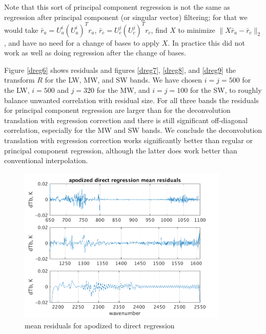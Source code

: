 \documentclass[11pt]{article}
\begin{document}
Note that this sort of principal component regression is not the
same as regression after principal component (or singular vector)
filtering; for that we would take $\bar r_a = U_a^i (U_a^i)^T r_a$,
$\bar r_c = U_c^j (U_c^j)^T r_c$, find $X$ to minimize $\|X \bar r_a
- \bar r_c\|_2$, and have no need for a change of bases to apply
$X$.  In practice this did not work as well as doing regression
after the change of bases.

Figure \ref{dreg6} shows residuals and figures \ref{dreg7},
\ref{dreg8}, and \ref{dreg9} the transform $R$ for the {\cris} LW,
MW, and SW bands.  We have chosen $i = j = 500$ for the LW, $i =
500$ and $j = 320$ for the MW, and $i = j = 100$ for the SW, to
roughly balance unwanted correlation with residual size.  For all
three bands the residuals for principal component regression are
larger than for the deconvolution translation with regression
correction and there is still significant off-diagonal correlation,
especially for the MW and SW bands.  We conclude the deconvolution
translation with regression correction works significantly better
than regular or principal component regression, although the latter
does work better than conventional interpolation.

\begin{figure} %
  \centering
  \includegraphics[height=7.5cm]{slackfigs/ap_direct_regr.png}
  \caption{mean residuals for apodized {\airs} to {\cris} direct
    regression}
  \label{dreg1}
\end{figure}
\end{document}
